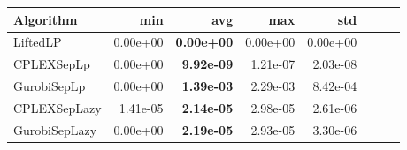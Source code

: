 \begin{tabular}{lrrrrrrr}
Algorithm & min & avg & max & std
\\
\hline
LiftedLP&0.00e+00& \bf0.00e+00& 0.00e+00& 0.00e+00\\
CPLEXSepLp&0.00e+00& \bf9.92e-09& 1.21e-07& 2.03e-08\\
GurobiSepLp&0.00e+00& \bf1.39e-03& 2.29e-03& 8.42e-04\\
CPLEXSepLazy&1.41e-05& \bf2.14e-05& 2.98e-05& 2.61e-06\\
GurobiSepLazy&0.00e+00& \bf2.19e-05& 2.93e-05& 3.30e-06
\end{tabular}
